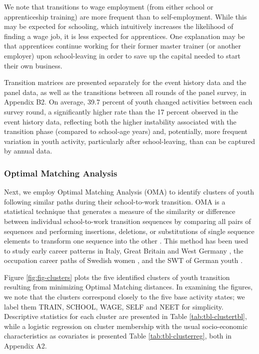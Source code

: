 \documentclass[
  a4paper, twoside, 12pt]{book}
\begin{document}
We note that transitions to wage employment (from either school or apprenticeship training) are more frequent than to self-employment. While this may be expected for schooling, which intuitively increases the likelihood of finding a wage job, it is less expected for apprentices. One explanation may be that apprentices continue working for their former master trainer (or another employer) upon school-leaving in order to save up the capital needed to start their own business.

Transition matrices are presented separately for the event history data and the panel data, as well as the transitions between all rounds of the panel survey, in Appendix B2. On average, 39.7 percent of youth changed activities between each survey round, a significantly higher rate than the 17 percent observed in the event history data, reflecting both the higher instability associated with the transition phase (compared to school-age years) and, potentially, more frequent variation in youth activity, particularly after school-leaving, than can be captured by annual data.

\hypertarget{optimal-matching-analysis}{%
\subsubsection*{Optimal Matching Analysis}\label{optimal-matching-analysis}}

Next, we employ Optimal Matching Analysis (OMA) to identify clusters of youth following similar paths during their school-to-work transition. OMA is a statistical technique that generates a measure of the similarity or difference between individual school-to-work transition sequences by comparing all pairs of sequences and performing insertions, deletions, or substitutions of single sequence elements to transform one sequence into the other \autocite{elzinga2003}. This method has been used to study early career patterns in Italy, Great Britain and West Germany \autocite{scherer2001,scherer2005}, the occupation career paths of Swedish women \autocite{huang2007}, and the SWT of German youth \autocite{achatz2022}.

Figure \ref{fig:fig-clusters} plots the five identified clusters of youth transition resulting from minimizing Optimal Matching distances. In examining the figures, we note that the clusters correspond closely to the five base activity states; we label them TRAIN, SCHOOL, WAGE, SELF and NEET for simplicity. Descriptive statistics for each cluster are presented in Table \ref{tab:tbl-clustertbl}, while a logistic regression on cluster membership with the usual socio-economic characteristics as covariates is presented Table \ref{tab:tbl-clusterreg}, both in Appendix A2.
\end{document}
